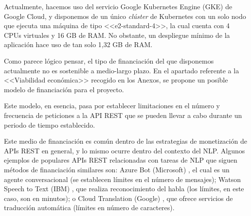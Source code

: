Actualmente, hacemos uso del servicio Google Kubernetes Engine (GKE) de Google Cloud, y disponemos de un único \emph{clúster} de Kubernetes con un solo nodo que ejecuta una máquina de tipo <<e2-standard-4>>, la cual cuenta con 4 CPUs virtuales y 16 GB de RAM. No obstante, un despliegue mínimo de la aplicación hace uso de tan solo 1,32 GB de RAM.

Como parece lógico pensar, el tipo de financiación del que disponemos actualmente no es sostenible a medio-largo plazo. En el apartado referente a la <<Viabilidad económica>> recogido en los Anexos, se propone un posible modelo de financiación para el proyecto.

Este modelo, en esencia, pasa por establecer limitaciones en el número y frecuencia de peticiones a la API REST que se pueden llevar a cabo durante un periodo de tiempo establecido.

Este medio de financiación es común dentro de las estrategias de monetización de APIs REST en general, y lo mismo ocurre dentro del contexto del NLP. Algunos ejemplos de populares APIs REST relacionadas con tareas de NLP que siguen métodos de financiación similares son: Azure Bot (Microsoft) \cite{azure-bot}, el cual es un agente conversacional (se establecen límites en el número de mensajes); Watson Speech to Text (IBM) \cite{watson-stt}, que realiza reconocimiento del habla (los límites, en este caso, son en minutos); o Cloud Translation (Google) \cite{cloud-translation}, que ofrece servicios de traducción automática (límites en número de caracteres).